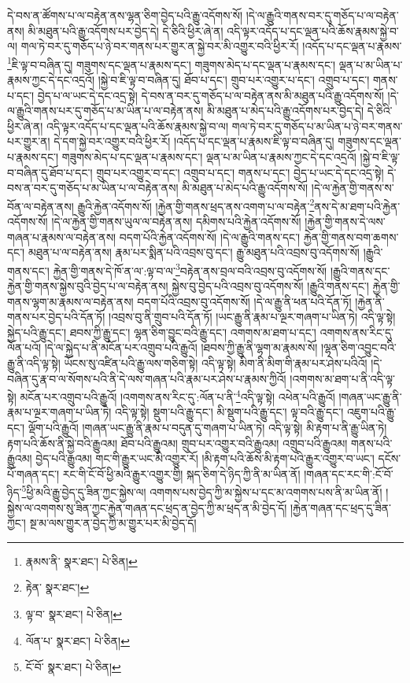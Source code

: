 དེ་བས་ན་ཚོགས་པ་ལ་བརྟེན་ནས་ལྷན་ཅིག་བྱེད་པའི་རྒྱུ་འདོགས་སོ། །དེ་ལ་རྒྱུའི་གནས་བར་དུ་གཅོད་པ་ལ་བརྟེན་ནས། མི་མཐུན་པའི་རྒྱུ་འདོགས་པར་བྱེད་དེ། དེ་ཅིའི་ཕྱིར་ཞེ་ན། འདི་ལྟར་འདོད་པ་དང་ལྡན་པའི་ཆོས་རྣམས་སྐྱེ་བ་ལ། གལ་ཏེ་བར་དུ་གཅོད་པ་ཉེ་བར་གནས་པར་གྱུར་ན་སྐྱེ་བར་མི་འགྱུར་བའི་ཕྱིར་རོ། །འདོད་པ་དང་ལྡན་པ་རྣམས་\footnote{རྣམས་ནི་  སྣར་ཐང་།  པེ་ཅིན། }ཇི་ལྟ་བ་བཞིན་དུ། གཟུགས་དང་ལྡན་པ་རྣམས་དང་། གཟུགས་མེད་པ་དང་ལྡན་པ་རྣམས་དང་། ལྡན་པ་མ་ཡིན་པ་རྣམས་ཀྱང་དེ་དང་འདྲའོ། །སྐྱེ་བ་ཇི་ལྟ་བ་བཞིན་དུ། ཐོབ་པ་དང་། གྲུབ་པར་འགྱུར་པ་དང་། འགྲུབ་པ་དང་། གནས་པ་དང་། བྱེད་པ་ལ་ཡང་དེ་དང་འདྲ་སྟེ། དེ་བས་ན་བར་དུ་གཅོད་པ་ལ་བརྟེན་ནས་མི་མཐུན་པའི་རྒྱུ་འདོགས་སོ། །དེ་ལ་རྒྱུའི་གནས་པར་དུ་གཅོད་པ་མ་ཡིན་པ་ལ་བརྟེན་ནས། མི་མཐུན་པ་མེད་པའི་རྒྱུ་འདོགས་པར་བྱེད་དེ། དེ་ཅིའི་ཕྱིར་ཞེ་ན། འདི་ལྟར་འདོད་པ་དང་ལྡན་པའི་ཆོས་རྣམས་སྐྱེ་བ་ལ། གལ་ཏེ་བར་དུ་གཅོད་པ་མ་ཡིན་པ་ཉེ་བར་གནས་པར་གྱུར་ན། དེ་དག་སྐྱེ་བར་འགྱུར་བའི་ཕྱིར་རོ། །འདོད་པ་དང་ལྡན་པ་རྣམས་ཇི་ལྟ་བ་བཞིན་དུ། གཟུགས་དང་ལྡན་པ་རྣམས་དང་། གཟུགས་མེད་པ་དང་ལྡན་པ་རྣམས་དང་། ལྡན་པ་མ་ཡིན་པ་རྣམས་ཀྱང་དེ་དང་འདྲའོ། །སྐྱེ་བ་ཇི་ལྟ་བ་བཞིན་དུ་ཐོབ་པ་དང་། གྲུབ་པར་འགྱུར་བ་དང་། འགྲུབ་པ་དང་། གནས་པ་དང་། བྱེད་པ་ཡང་དེ་དང་འདྲ་སྟེ། དེ་བས་ན་བར་དུ་གཅོད་པ་མ་ཡིན་པ་ལ་བརྟེན་ནས། མི་མཐུན་པ་མེད་པའི་རྒྱུ་འདོགས་སོ། །དེ་ལ་རྐྱེན་གྱི་གནས་ས་བོན་ལ་བརྟེན་ནས། རྒྱུའི་རྐྱེན་འདོགས་སོ། །རྐྱེན་གྱི་གནས་ཕྲད་ནས་འགག་པ་ལ་བརྟེན་\footnote{རྟེན་  སྣར་ཐང་། }ནས་དེ་མ་ཐག་པའི་རྐྱེན་འདོགས་སོ། །དེ་ལ་རྐྱེན་གྱི་གནས་ཡུལ་ལ་བརྟེན་ནས། དམིགས་པའི་རྐྱེན་འདོགས་སོ། །རྐྱེན་གྱི་གནས་དེ་ལས་གཞན་པ་རྣམས་ལ་བརྟེན་ནས། བདག་པོའི་རྐྱེན་འདོགས་སོ། །དེ་ལ་རྒྱུའི་གནས་དང་། རྐྱེན་གྱི་གནས་བག་ཆགས་དང་། མཐུན་པ་ལ་བརྟེན་ནས། རྣམ་པར་སྨིན་པའི་འབྲས་བུ་དང་། རྒྱུ་མཐུན་པའི་འབྲས་བུ་འདོགས་སོ། །རྒྱུའི་གནས་དང་། རྐྱེན་གྱི་གནས་དེ་ཁོ་ན་ལ་:ལྟ་བ་ལ་\footnote{ལྟ་བ་  སྣར་ཐང་།  པེ་ཅིན། }བརྟེན་ནས་བྲལ་བའི་འབྲས་བུ་འདོགས་སོ། །རྒྱུའི་གནས་དང་རྐྱེན་གྱི་གནས་སྐྱེས་བུའི་བྱེད་པ་ལ་བརྟེན་ནས། སྐྱེས་བུ་བྱེད་པའི་འབྲས་བུ་འདོགས་སོ། །རྒྱུའི་གནས་དང་། རྐྱེན་གྱི་གནས་ལྷག་མ་རྣམས་ལ་བརྟེན་ནས། བདག་པོའི་འབྲས་བུ་འདོགས་སོ། །དེ་ལ་རྒྱུ་ནི་ཕན་པའི་དོན་ཏོ། །རྐྱེན་ནི་གནས་པར་བྱེད་པའི་དོན་ཏོ། །འབྲས་བུ་ནི་གྲུབ་པའི་དོན་ཏོ། །ཡང་རྒྱུ་ནི་རྣམ་པ་ལྔར་གཞག་པ་ཡིན་ཏེ། འདི་ལྟ་སྟེ། སྐྱེད་པའི་རྒྱུ་དང་། ཐབས་ཀྱི་རྒྱུ་དང་། ལྷན་ཅིག་བྱུང་བའི་རྒྱུ་དང་། འགགས་མ་ཐག་པ་དང་། འགགས་ནས་རིང་དུ་ལོན་པའོ། །དེ་ལ་སྐྱེད་པ་ནི་མངོན་པར་འགྲུབ་པའི་རྒྱུའོ། །ཐབས་ཀྱི་རྒྱུ་ནི་ལྷག་མ་རྣམས་སོ། །ལྷན་ཅིག་འབྱུང་བའི་རྒྱུ་ནི་འདི་ལྟ་སྟེ། ཡོངས་སུ་འཛིན་པའི་རྒྱུ་ལས་གཅིག་སྟེ། འདི་ལྟ་སྟེ། མིག་ནི་མིག་གི་རྣམ་པར་ཤེས་པའིའོ། །དེ་བཞིན་དུ་རྣ་བ་ལ་སོགས་པའི་ནི་དེ་ལས་གཞན་པའི་རྣམ་པར་ཤེས་པ་རྣམས་ཀྱིའོ། །འགགས་མ་ཐག་པ་ནི་འདི་ལྟ་སྟེ། མངོན་པར་འགྲུབ་པའི་རྒྱུའོ། །འགགས་ནས་རིང་དུ་:ལོན་པ་ནི་\footnote{ལོན་པ་  སྣར་ཐང་།  པེ་ཅིན། }འདི་ལྟ་སྟེ། འཕེན་པའི་རྒྱུའོ། །གཞན་ཡང་རྒྱུ་ནི་རྣམ་པ་ལྔར་གཞག་པ་ཡིན་ཏེ། འདི་ལྟ་སྟེ། སྡུག་པའི་རྒྱུ་དང་། མི་སྡུག་པའི་རྒྱུ་དང་། ལྟ་བའི་རྒྱུ་དང་། འཇུག་པའི་རྒྱུ་དང་། ལྡོག་པའི་རྒྱུའོ། །གཞན་ཡང་རྒྱུ་ནི་རྣམ་པ་བདུན་དུ་གཞག་པ་ཡིན་ཏེ། འདི་ལྟ་སྟེ། མི་རྟག་པ་ནི་རྒྱུ་ཡིན་ཏེ། རྟག་པའི་ཆོས་ནི་སྐྱེ་བའི་རྒྱུའམ། ཐོབ་པའི་རྒྱུའམ། གྲུབ་པར་འགྱུར་བའི་རྒྱུའམ། འགྲུབ་པའི་རྒྱུའམ། གནས་པའི་རྒྱུའམ། བྱེད་པའི་རྒྱུའམ། གང་གི་རྒྱུར་ཡང་མི་འགྱུར་རོ། །མི་རྟག་པའི་ཆོས་མི་རྟག་པའི་རྒྱུར་འགྱུར་བ་ཡང་། དངོས་པོ་གཞན་དང་། རང་གི་ངོ་བོ་ཕྱི་མའི་རྒྱུར་འགྱུར་གྱི། སྐད་ཅིག་དེ་ཉིད་ཀྱི་ནི་མ་ཡིན་ནོ། །གཞན་དང་རང་གི་:ངོ་བོ་ཉིད་\footnote{ངོ་བོ་  སྣར་ཐང་།  པེ་ཅིན། }ཕྱི་མའི་རྒྱུ་བྱེད་དུ་ཟིན་ཀྱང་སྐྱེས་ལ། འགགས་པས་བྱེད་ཀྱི་མ་སྐྱེས་པ་དང་མ་འགགས་པས་ནི་མ་ཡིན་ནོ། །སྐྱེས་ལ་འགགས་སུ་ཟིན་ཀྱང་རྐྱེན་གཞན་དང་ཕྲད་ན་བྱེད་ཀྱི་མ་ཕྲད་ན་མི་བྱེད་དོ། །རྐྱེན་གཞན་དང་ཕྲད་དུ་ཟིན་ཀྱང་། སྔ་མ་ལས་གྱུར་ན་བྱེད་ཀྱི་མ་གྱུར་པར་མི་བྱེད་དོ། 